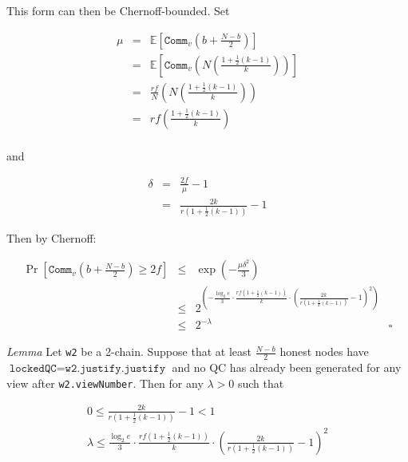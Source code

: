 \documentclass[11pt, oneside]{article}       %
\begin{document}
This form can then be Chernoff-bounded. Set

\[
    \begin{array}{rclr}
        \mu &=& \mathbb{E}\left[\texttt{Comm}_v\left(b +
        \frac{N-b}{2}\right)\right] \\
            &=& \mathbb{E}\left[\texttt{Comm}_v\left(N\left(\frac{1 +
            \frac{1}{2}(k-1)}{k}\right)\right)\right] \\
            &=& \frac{rf}{N}\left(N\left(\frac{1 +
            \frac{1}{2}(k-1)}{k}\right)\right) \\
            &=& rf\left(\frac{1 +
            \frac{1}{2}(k-1)}{k}\right) \\
    \end{array}
\]

and

\[
    \begin{array}{rclr}
        \delta &=& \frac{2f}{\mu} - 1 \\
        &=& \frac{2k}{r\left(1+\frac{1}{2}(k-1)\right)} - 1
    \end{array}
\]

Then by Chernoff:

\[
    \begin{array}{rclr}
        \Pr\left[\texttt{Comm}_v\left(b+\frac{N-b}{2}\right) \geq 2f\right]
        &\leq& \exp\left(-\frac{\mu{\delta}^2}{3}\right) \\

        &\leq& 2^{\left(-\frac{\log_2 e
        }{3}\cdot\frac{rf\left(1+\frac{1}{2}(k-1)\right)}{k}\cdot
        {\left(\frac{2k}{r\left(1+\frac{1}{2}(k-1)\right)} -
        1\right)}^2\right)} \\
        &\leq& 2^{-\lambda} & \square
    \end{array}
\]

\emph{Lemma} Let \texttt{w2} be a 2-chain. Suppose that at least
\(\frac{N-b}{2}\) honest nodes have \(\texttt{lockedQC} =
\texttt{w2.justify.justify}\) and no QC has already been generated for any
view after \texttt{w2.viewNumber}. Then for any \(\lambda > 0\) such that

\begin{equation}\label{lemma_majority}
    \begin{array}{c}
        0 \leq \frac{2k}{r\left(1+\frac{1}{2}(k-1)\right)} - 1 < 1 \\
        \lambda \leq \frac{\log_2 e
        }{3}\cdot\frac{rf\left(1+\frac{1}{2}(k-1)\right)}{k}\cdot
        {\left(\frac{2k}{r\left(1+\frac{1}{2}(k-1)\right)} - 1\right)}^2
    \end{array}
\end{equation}
\end{document}
